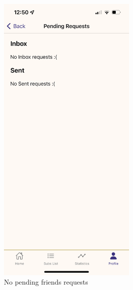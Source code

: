 \documentclass[12pt]{article}
\begin{document}
\begin{figure}[h!]
\begin{minipage}[c]{0.45\textwidth}
        \includegraphics[width=0.6\textwidth, clip]{../../assets/smartphone/pending.PNG}
        \caption{No pending friends requests}
        \label{fig:pending}
    \end{minipage}
\end{figure}
\end{document}

